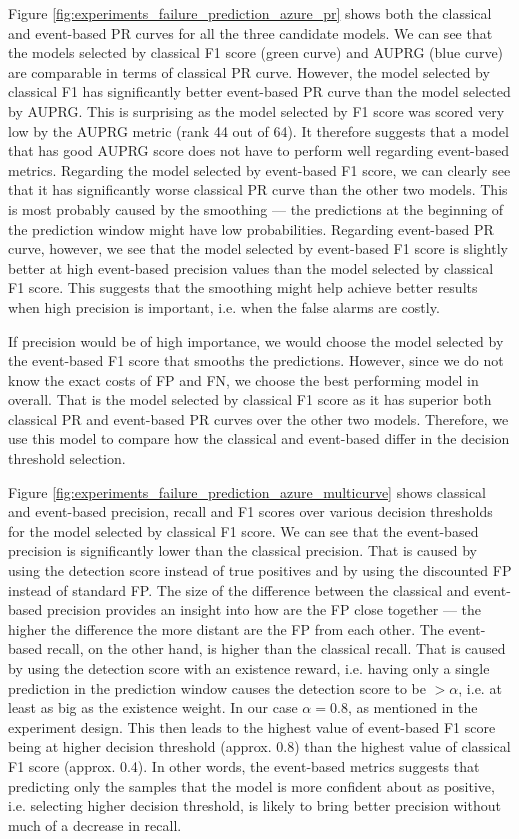 Figure \ref{fig:experiments_failure_prediction_azure_pr} shows both the classical and event-based PR curves for all the three candidate models.
We can see that the models selected by classical F1 score (green curve) and AUPRG (blue curve) are comparable in terms of classical PR curve.
However, the model selected by classical F1 has significantly better event-based PR curve than the model selected by AUPRG.
This is surprising as the model selected by F1 score was scored very low by the AUPRG metric (rank 44 out of 64).
It therefore suggests that a model that has good AUPRG score does not have to perform well regarding event-based metrics.
Regarding the model selected by event-based F1 score, we can clearly see that it has significantly worse classical PR curve than the other two models.
This is most probably caused by the smoothing --- the predictions at the beginning of the prediction window might have low probabilities.
Regarding event-based PR curve, however, we see that the model selected by event-based F1 score is slightly better at high event-based precision values than the model selected by classical F1 score.
This suggests that the smoothing might help achieve better results when high precision is important, i.e. when the false alarms are costly.

If precision would be of high importance, we would choose the model selected by the event-based F1 score that smooths the predictions.
However, since we do not know the exact costs of FP and FN, we choose the best performing model in overall.
That is the model selected by classical F1 score as it has superior both classical PR and event-based PR curves over the other two models.
Therefore, we use this model to compare how the classical and event-based differ in the decision threshold selection.

Figure \ref{fig:experiments_failure_prediction_azure_multicurve} shows classical and event-based precision, recall and F1 scores over various decision thresholds for the model selected by classical F1 score.
We can see that the event-based precision is significantly lower than the classical precision.
That is caused by using the detection score instead of true positives and by using the discounted FP instead of standard FP.
The size of the difference between the classical and event-based precision provides an insight into how are the FP close together --- the higher the difference the more distant are the FP from each other.
The event-based recall, on the other hand, is higher than the classical recall.
That is caused by using the detection score with an existence reward, i.e. having only a single prediction in the prediction window causes the detection score to be $> \alpha$, i.e. at least as big as the existence weight.
In our case $\alpha = 0.8$, as mentioned in the experiment design. 
This then leads to the highest value of event-based F1 score being at higher decision threshold (approx. 0.8) than the highest value of classical F1 score (approx. 0.4).
In other words, the event-based metrics suggests that predicting only the samples that the model is more confident about as positive, i.e. selecting higher decision threshold, is likely to bring better precision without much of a decrease in recall.

